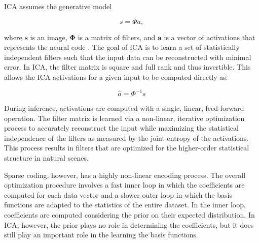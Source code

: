 ICA assumes the generative model

\begin{equation}\label{eq:ch2_ica_generative_model}
    s = \Phi a,
\end{equation}

\noindent where $\mathbf{s}$ is an image, $\mathbf{\Phi}$ is a matrix of filters, and $\mathbf{a}$ is a vector of activations that represents the neural code \parencite{bell1997independent}. The goal of ICA is to learn a set of statistically independent filters such that the input data can be reconstructed with minimal error. In ICA, the filter matrix is square and full rank and thus invertible. This allows the ICA activations for a given input to be computed directly as:

\begin{equation}
    \hat{a} = \Phi^{-1}s
\end{equation}

During inference, activations are computed with a single, linear, feed-forward operation. The filter matrix is learned via a non-linear, iterative optimization process to accurately reconstruct the input while maximizing the statistical independence of the filters as measured by the joint entropy of the activations. This process results in filters that are optimized for the higher-order statistical structure in natural scenes.

Sparse coding, however, has a highly non-linear encoding process. The overall optimization procedure involves a fast inner loop in which the coefficients are computed for each data vector and a slower outer loop in which the basis functions are adapted to the statistics of the entire dataset. In the inner loop, coefficients are computed considering the prior on their expected distribution. In ICA, however, the prior plays no role in determining the coefficients, but it does still play an important role in the learning the basis functions.

